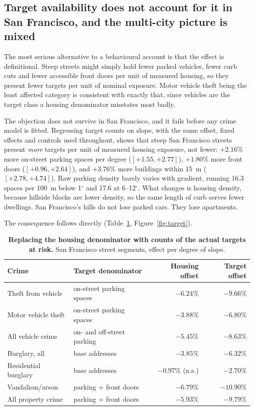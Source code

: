 \documentclass[11pt,letterpaper]{article}
\begin{document}
\subsection{Target availability does not account for it in San Francisco, and the multi-city picture is mixed}

The most serious alternative to a behavioural account is that the effect is
definitional. Steep streets might simply hold fewer parked vehicles, fewer curb cuts
and fewer accessible front doors per unit of measured housing, so they present fewer
targets per unit of nominal exposure. Motor vehicle theft being the least affected
category is consistent with exactly that, since vehicles are the target class a
housing denominator misstates most badly.

The objection does not survive in San Francisco, and it fails before any crime model
is fitted. Regressing target counts on
slope, with the same offset, fixed effects and controls used throughout, shows that
steep San Francisco streets present \emph{more} targets per unit of measured housing
exposure, not fewer: $+2.16\%$ more on-street parking spaces per degree
($[+1.55, +2.77]$), $+1.80\%$ more front doors ($[+0.96, +2.64]$), and $+3.76\%$ more
buildings within 15~m ($[+2.78, +4.74]$). Raw parking density barely varies with
gradient, running 16.3 spaces per 100~m below 1$^\circ$ and 17.6 at 6--12$^\circ$.
What changes is housing density, because hillside blocks are lower density, so the
same length of curb serves fewer dwellings. San Francisco's hills do not lose parked
cars. They lose apartments.

The consequence follows directly (Table~\ref{tab:target}, Figure~\ref{fig:target}).

\begin{table}[!ht]
\centering
\caption{{\bf Replacing the housing denominator with counts of the actual targets at
risk.} San Francisco street segments, effect per degree of slope.}
\label{tab:target}
\begin{tabular}{llrr}
\toprule
Crime & Target denominator & Housing offset & Target offset \\
\midrule
Theft from vehicle & on-street parking spaces & $-6.24\%$ & $-9.66\%$ \\
Motor vehicle theft & on-street parking spaces & $-3.88\%$ & $-6.80\%$ \\
All vehicle crime & on- and off-street parking & $-5.45\%$ & $-8.63\%$ \\
Burglary, all & base addresses & $-3.85\%$ & $-6.32\%$ \\
Residential burglary & base addresses & $-0.97\%$ (n.s.) & $-2.70\%$ \\
Vandalism/arson & parking + front doors & $-6.79\%$ & $-10.90\%$ \\
All property crime & parking + front doors & $-5.93\%$ & $-9.79\%$ \\
\bottomrule
\end{tabular}
\end{table}
\end{document}
